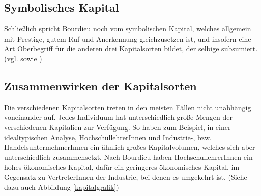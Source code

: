 \documentclass[a4paper, german, oneside]{scrbook}
\begin{document}
\subsection{Symbolisches Kapital}
Schließlich spricht Bourdieu noch vom symbolischen Kapital, welches allgemein mit Prestige, gutem Ruf und Anerkennung gleichzusetzen ist, und insofern eine Art Oberbegriff für die anderen drei Kapitalsorten bildet, der selbige subsumiert. (vgl. \cite[540]{joas_sozialtheorie:_2004} sowie \cite[87]{luthje_medium_2008})

\subsection{Zusammenwirken der Kapitalsorten}
Die verschiedenen Kapitalsorten treten in den meisten Fällen nicht unabhängig voneinander auf. Jedes Individuum hat unterschiedlich große Mengen der verschiedenen Kapitalien zur Verfügung. So haben zum Beispiel, in einer idealtypischen Analyse, HochschullehrerInnen und Industrie-, bzw. HandelsuntermehmerInnen ein ähnlich großes Kapitalvolumen, welches sich aber unterschiedlich zusammensetzt. Nach Bourdieu haben HochschullehrerInnen ein hohes ökonomisches Kapital, dafür ein geringeres ökonomisches Kapital, im Gegensatz zu VertreterInnen der Industrie, bei denen es umgekehrt ist. (Siehe dazu auch Abbildung \ref{kapitalgrafik}) \parencite[vgl.][541]{joas_sozialtheorie:_2004}
\end{document}
